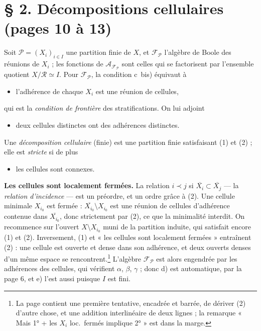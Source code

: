 \documentclass[11pt,a4paper]{article}
\begin{document}
\section*{§ 2. Décompositions cellulaires (pages 10 à 13)}

Soit $\mathcal{P} = (X_i)_{i \in I}$ une partition finie de $X$, et
$\mathcal{F}_{\mathcal{P}}$ l'algèbre de Boole des réunions de $X_i$ ; les
fonctions de $\mathcal{A}_{\mathcal{F}_{\mathcal{P}}}$ sont celles qui se
factorisent par l'ensemble quotient $X/\mathcal{R} \simeq I$. Pour
$\mathcal{F}_{\mathcal{P}}$, la condition c~bis) équivaut à

\begin{itemize}
\item[(1)] l'adhérence de chaque $X_i$ est une réunion de cellules,
\end{itemize}

qui est la \emph{condition de frontière} des stratifications. On lui adjoint

\begin{itemize}
\item[(2)] deux cellules distinctes ont des adhérences distinctes.
\end{itemize}

Une \emph{décomposition cellulaire} (finie) est une partition finie
satisfaisant (1) et (2) ; elle est \emph{stricte} si de plus

\begin{itemize}
\item[(3)] les cellules sont connexes.
\end{itemize}

\textbf{Les cellules sont localement fermées.} La relation $i \prec j$ si
$\overline{X_i} \subset \overline{X_j}$ — la \emph{relation d'incidence} — est
un préordre, et un ordre grâce à (2). Une cellule minimale $X_{i_0}$ est
fermée : $\overline{X_{i_0}} \setminus X_{i_0}$ est une réunion de cellules
d'adhérence contenue dans $\overline{X_{i_0}}$, donc strictement par (2), ce
que la minimalité interdit. On recommence sur l'ouvert $X \setminus X_{i_0}$
muni de la partition induite, qui satisfait encore (1) et (2). Inversement, (1)
et « les cellules sont localement fermées » entraînent (2) : une cellule est
ouverte et dense dans son adhérence, et deux ouverts denses d'un même espace se
rencontrent.\footnote{La page contient une première tentative, encadrée et
barrée, de dériver (2) d'autre chose, et une addition interlinéaire de deux
lignes ; la remarque « Mais 1° + les $X_i$ loc.\ fermés implique 2° » est dans
la marge.} L'algèbre $\mathcal{F}_{\mathcal{P}}$ est alors engendrée par les
adhérences des cellules, qui vérifient $\alpha$, $\beta$, $\gamma$ ; donc d)
est automatique, par la page 6, et e) l'est aussi puisque $I$ est fini.
\end{document}
